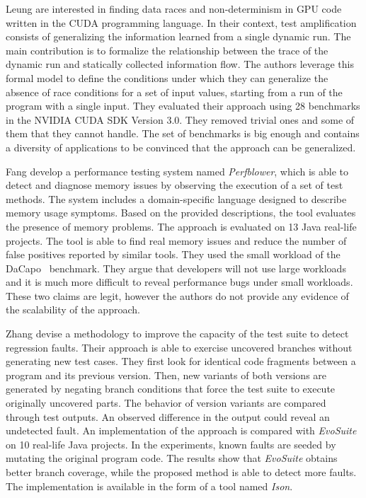 Leung \etal\cite{leung12} are interested in finding data races and non-determinism in GPU code written in the CUDA programming language.
In their context, test amplification consists of generalizing the information learned from a single dynamic run. 
The main contribution is to formalize the relationship between the trace of the dynamic run and statically collected information flow. 
The authors leverage this formal model to define the conditions under which they can generalize the absence of race conditions for a set of input values, starting from a run of the program with a single input.
They evaluated their approach using 28 benchmarks in the NVIDIA CUDA SDK Version 3.0. 
They removed trivial ones and some of them that they cannot handle. 
The set of benchmarks is big enough and contains a diversity of applications to be convinced that the approach can be generalized.


Fang \etal\cite{fang2015perfblower} develop a performance testing system named \emph{Perfblower}, which is able to detect and diagnose memory issues by observing the execution of a set of test methods. 
The system includes a domain-specific language designed to describe memory usage symptoms. 
Based on the provided descriptions, the tool evaluates the presence of memory problems. 
The approach is evaluated on 13 Java real-life projects. 
The tool is able to find real memory issues and reduce the number of false positives reported by similar tools.
They used the small workload of the DaCapo~\cite{DaCapo} benchmark. 
They argue that developers will not use large workloads and it is much more difficult to reveal performance bugs under small workloads. 
These two claims are legit, however the authors do not provide any evidence of the scalability of the approach.

Zhang \etal\cite{Zhang2016Isomorphic} devise a methodology to improve the capacity of the test suite to detect regression faults. 
Their approach is able to exercise uncovered branches without generating new test cases. 
They first look for identical code fragments between a program and its previous version. 
Then, new variants of both versions are generated by negating branch conditions that force the test suite to execute originally uncovered parts. 
The behavior of version variants are compared through test outputs. 
An observed difference in the output could reveal an undetected fault. 
An implementation of the approach is compared with \emph{EvoSuite} \cite{fraser2011evosuite} on 10 real-life Java projects. 
In the experiments, known faults are seeded by mutating the original program code. 
The results show that \emph{EvoSuite} obtains better branch coverage, while the proposed method is able to detect more faults. 
The implementation is available in the form of a tool named \emph{Ison}.

